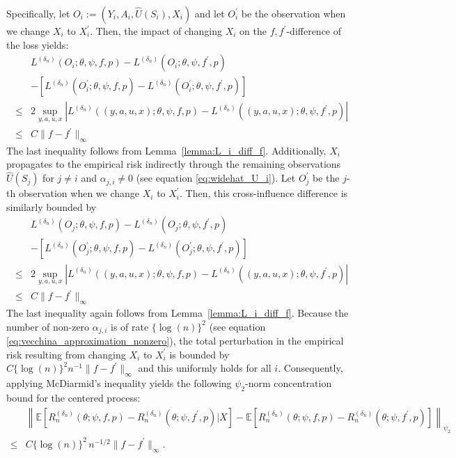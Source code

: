\documentclass[12pt]{article}
\newcommand{\E}{\mathbb{E}}
\begin{document}
Specifically, let $O_i:=(Y_i,A_i,\widehat U(S_i),X_i)$ and let $O_i^\prime$ be the observation when we change $X_i$ to $X_i^\prime$. Then, the impact of changing $X_i$ on the $f,f^\prime$-difference of the loss yields:
\begin{align*}
&L^{(\delta_n)}(O_i;\theta,\psi,f,p) - L^{(\delta_n)}(O_i;\theta,\psi,f^\prime,p)\\
        & -\left[L^{(\delta_n)}(O_i^\prime;\theta,\psi,f,p) - L^{(\delta_n)}(O_i^\prime;\theta,\psi,f^\prime,p)\right]\\
        \leq  & 2\sup_{y,a,u,x}\left|L^{(\delta_n)}((y,a,u,x);\theta,\psi,f,p) - L^{(\delta_n)}((y,a,u,x);\theta,\psi,f^\prime,p)\right|\\
        \leq & C\|f-f^\prime\|_\infty
\end{align*}
The last inequality follows from Lemma~\ref{lemma:L_i_diff_f}. Additionally, $X_i$ propagates to the empirical risk indirectly through the remaining observations $\widehat U(S_j)$ for $j\neq i$ and $\alpha_{j,i}\neq 0$ (see equation \eqref{eq:widehat_U_i}). Let $O_j^\prime$ be the $j$-th observation when we change $X_i$ to $X_i^\prime$. Then, this cross-influence difference is similarly bounded by
\begin{align*}
&L^{(\delta_n)}(O_j;\theta,\psi,f,p) - L^{(\delta_n)}(O_j;\theta,\psi,f^\prime,p)\\
        & -\left[L^{(\delta_n)}(O_j^\prime;\theta,\psi,f,p) - L^{(\delta_n)}(O_j^\prime;\theta,\psi,f^\prime,p)\right]\\
        \leq  & 2\sup_{y,a,u,x}\left|L^{(\delta_n)}((y,a,u,x);\theta,\psi,f,p) - L^{(\delta_n)}((y,a,u,x);\theta,\psi,f^\prime,p)\right|\\
        \leq & C\|f-f^\prime\|_\infty
\end{align*}
The last inequality again follows from Lemma~\ref{lemma:L_i_diff_f}. Because the number of non-zero $\alpha_{j,i}$ is of rate $\{\log(n)\}^2$ (see equation \eqref{eq:vecchina_approximation_nonzero}), the total perturbation in the empirical risk resulting from changing $X_i$ to $X_i^\prime$ is bounded by $C\{\log(n)\}^2 n^{-1}\|f-f^\prime\|_{\infty}$ and this uniformly holds for all $i$. Consequently, applying McDiarmid's inequality yields the following $\psi_2$-norm concentration bound for the centered process:
\begin{align*}
    &\left\|\E\left[R_n^{(\delta_n)}(\theta;\psi,f,p)-R_n^{({\delta_n})}(\theta;\psi,f^\prime,p)|X\right]-\E\left[R_n^{(\delta_n)}(\theta;\psi,f,p)-R_n^{({\delta_n})}(\theta;\psi,f^\prime,p)\right]\right\|_{\psi_2}\\
    \leq & C\{\log(n)\}^2\,n^{-1/2}\|f-f^\prime\|_{\infty}.
\end{align*}
\end{document}
